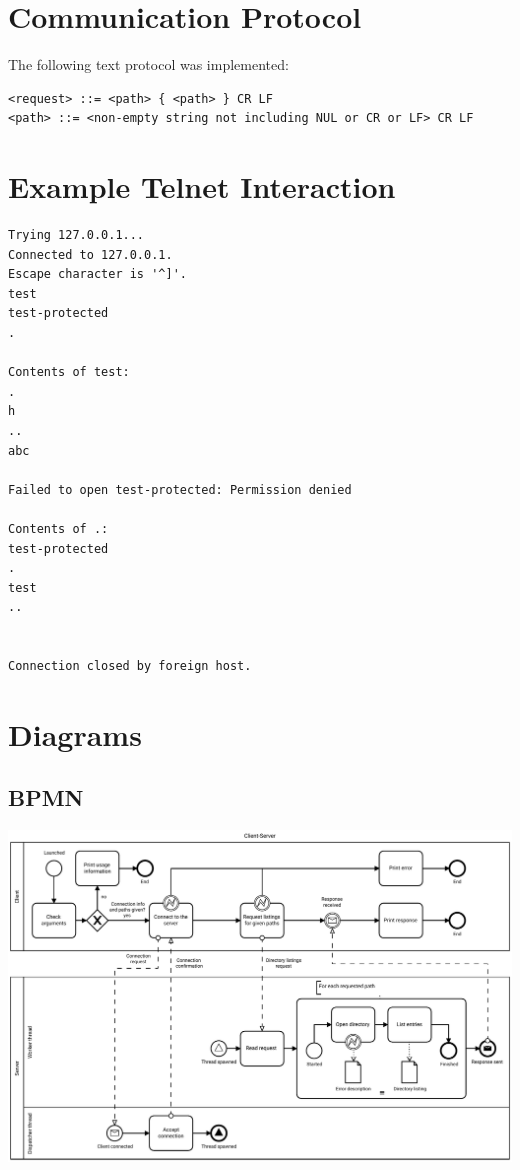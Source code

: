 \documentclass[en, listings]{labreport}
\begin{document}
\section*{Communication Protocol}

The following text protocol was implemented:

\begin{verbatim}
<request> ::= <path> { <path> } CR LF
<path> ::= <non-empty string not including NUL or CR or LF> CR LF
\end{verbatim}

\newpage

\section*{Example Telnet Interaction}

\begin{verbatim}
Trying 127.0.0.1...
Connected to 127.0.0.1.
Escape character is '^]'.
test
test-protected
.

Contents of test:
.
h
..
abc

Failed to open test-protected: Permission denied

Contents of .:
test-protected
.
test
..


Connection closed by foreign host.
\end{verbatim}

\section*{Diagrams}

\subsection*{BPMN}
\noindent
\includegraphics[width=1.05\textwidth]{diagrams/bpmn}
\end{document}
